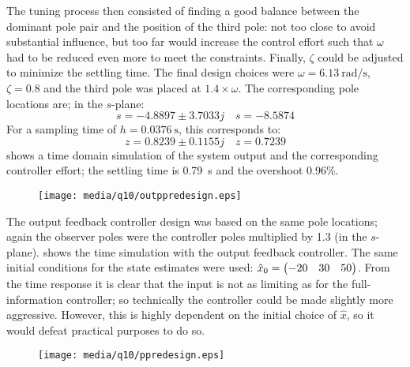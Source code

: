 The tuning process then consisted of finding a good balance between the dominant pole pair and the position of the third pole: not too close to avoid substantial influence, but too far would increase the control effort such that $\omega$ had to be reduced even more to meet the constraints. Finally, $\zeta$ could be adjusted to minimize the settling time. The final design choices were $\omega = \SI{6.13}{\radian\per\second}$, $\zeta = 0.8$ and the third pole was placed at $1.4\times\omega$. The corresponding pole locations are; in the $s$-plane:
$$ s = -4.8897 \pm 3.7033j  \quad s = -8.5874$$
For a sampling time of $h = \SI{0.0376}{\second}$, this corresponds to:
$$z = 0.8239 \pm 0.1155j \quad z = 0.7239$$
 shows a time domain simulation of the system output and the corresponding controller effort; the settling time is \SI{0.79}{\second} and the overshoot 0.96\%.
\begin{figure}[ht]
    \centering
    \texttt{[image: media/q10/outppredesign.eps]}
    \caption{}
    \label{fig:q10_ppredesign}
\end{figure}
The output feedback controller design was based on the same pole locations; again the observer poles were the controller poles multiplied by 1.3 (in the $s$-plane).  shows the time simulation with the output feedback controller. The same initial conditions for the state estimates were used: $\hat{x}_0 = \mqty(-20 & 30 & 50)$. From the time response it is clear that the input is not as limiting as for the full-information controller; so technically the controller could be made slightly more aggressive. However, this is highly dependent on the initial choice of $\hat{x}$, so it would defeat practical purposes to do so.
\begin{figure}[ht]
    \centering
    \texttt{[image: media/q10/ppredesign.eps]}
    \caption{}
    \label{fig:q10_outppredesign}
\end{figure}
\FloatBarrier

